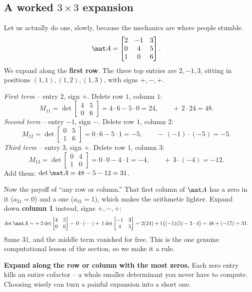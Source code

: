 \subsection{A worked \texorpdfstring{$3\times3$}{3x3} expansion}

Let us actually do one, slowly, because the mechanics are where people stumble.
\[
\mat A=\begin{bmatrix} 2 & -1 & 3 \\ 0 & 4 & 5 \\ 1 & 0 & 6 \end{bmatrix}.
\]
We expand along the \textbf{first row}. The three top entries are $2,-1,3$, sitting in positions
$(1,1),(1,2),(1,3)$, with signs $+,-,+$.

\emph{First term} -- entry $2$, sign $+$. Delete row $1$, column $1$:
\[
M_{11}=\det\begin{bmatrix} 4 & 5 \\ 0 & 6 \end{bmatrix}=4\cdot6-5\cdot0=24,
\qquad +\,2\cdot 24 = 48.
\]
\emph{Second term} -- entry $-1$, sign $-$. Delete row $1$, column $2$:
\[
M_{12}=\det\begin{bmatrix} 0 & 5 \\ 1 & 6 \end{bmatrix}=0\cdot6-5\cdot1=-5,
\qquad -\,(-1)\cdot(-5) = -5.
\]
\emph{Third term} -- entry $3$, sign $+$. Delete row $1$, column $3$:
\[
M_{13}=\det\begin{bmatrix} 0 & 4 \\ 1 & 0 \end{bmatrix}=0\cdot0-4\cdot1=-4,
\qquad +\,3\cdot(-4) = -12.
\]
Add them: $\det\mat A = 48-5-12 = 31$.

Now the payoff of ``any row or column.'' That first column of $\mat A$ has a zero in it ($a_{21}=0$)
and a one ($a_{31}=1$), which makes the arithmetic lighter. Expand down \textbf{column 1} instead,
signs $+,-,+$:
\[
\det\mat A
= +\,2\det\begin{bmatrix}4&5\\0&6\end{bmatrix}
 -\,0\cdot(\cdots)
 +\,1\det\begin{bmatrix}-1&3\\4&5\end{bmatrix}
= 2(24) + 1\big((-1)(5)-3\cdot4\big)
= 48 + (-17) = 31.
\]
Same $31$, and the middle term vanished for free. This is the one genuine computational lesson of the
section, so we make it a rule.

\begin{focusbox}
\textbf{Expand along the row or column with the most zeros.} Each zero entry kills an entire cofactor
-- a whole smaller determinant you never have to compute. Choosing wisely can turn a painful
expansion into a short one.
\end{focusbox}

